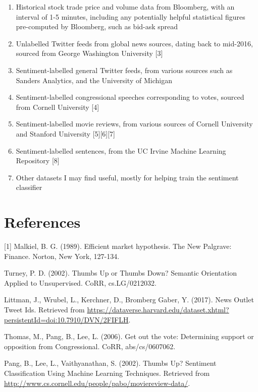\documentclass[12pt,a4paper,twoside,openright]{report}
\begin{document}
\begin{enumerate}
\item
Historical stock trade price and volume data from Bloomberg, with an interval of 1-5
minutes, including any potentially helpful statistical figures pre-computed by Bloomberg,
such as bid-ask spread

\item
Unlabelled Twitter feeds from global news sources, dating back to mid-2016, sourced
from George Washington University [3]

\item
Sentiment-labelled general Twitter feeds, from various sources such as Sanders
Analytics, and the University of Michigan

\item
Sentiment-labelled congressional speeches corresponding to votes, sourced from Cornell
University [4]

\item
Sentiment-labelled movie reviews, from various sources of Cornell University and
Stanford University [5][6][7]

\item
Sentiment-labelled sentences, from the UC Irvine Machine Learning Repository [8]

\item
Other datasets I may find useful, mostly for helping train the sentiment classifier
\end{enumerate}

\section*{References}
[1] Malkiel, B. G. (1989). Efficient market hypothesis. The New Palgrave: Finance. Norton, New
York, 127-134.

\noindent [2] Turney, P. D. (2002). Thumbs Up or Thumbs Down? Semantic Orientation Applied to
Unsupervised. CoRR, cs.LG/0212032.

\noindent [3] Littman, J., Wrubel, L., Kerchner, D., Bromberg Gaber, Y. (2017). News Outlet Tweet Ids.
Retrieved from
\url{https://dataverse.harvard.edu/dataset.xhtml?persistentId=doi:10.7910/DVN/2FIFLH}.

\noindent [4] Thomas, M., Pang, B., Lee, L. (2006). Get out the vote: Determining support or opposition
from Congressional. CoRR, abs/cs/0607062.

\noindent [5] Pang, B., Lee, L., Vaithyanathan, S. (2002). Thumbs Up? Sentiment Classification Using
Machine Learning Techniques. Retrieved from \url{http://www.cs.cornell.edu/people/pabo/moviereview-data/}.
\end{document}
